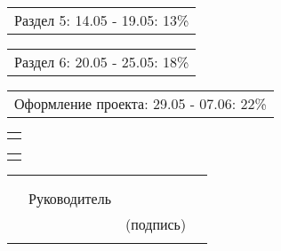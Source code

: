 \documentclass[12pt, А4, twoside]{article}
\begin{document}
\begin{FlushLeft}
		\vspace{-0.1 cm}
		
		\begin{tabular}{p{17.25cm}} 
			\hspace{0.3cm} \textsf{Раздел 5:} \hspace{2.54cm} \textsf{ 14.05 - 19.05:} \hspace{0.5cm} \textsf{13\%} \vspace{1pt} \hline \\
		\end{tabular} 
		
		\vspace{-0.1 cm}
		
		\begin{tabular}{p{17.25cm}} 
			\hspace{0.3cm} \textsf{Раздел 6:} \hspace{2.54cm} \textsf{ 20.05 - 25.05:} \hspace{0.5cm} \textsf{18\%} \vspace{1pt} \hline \\
		\end{tabular} 
		
		\vspace{-0.1 cm}
		
		\begin{tabular}{p{17.25cm}} 
			\hspace{0.3cm} \textsf{Оформление проекта:} \hspace{0.5cm} \textsf{ 29.05 - 07.06:} \hspace{0.5cm} \textsf{22\%} \vspace{1pt} \hline \\
		\end{tabular} 
		
		\begin{tabular}{p{17.25cm}}
			\vspace{0pt} \hline \\
		\end{tabular}
		
		\begin{tabular}{p{17.25cm}}
			\vspace{0pt} \hline  \\
		\end{tabular}
		
		
		
		\begin{tabular}{p{4.2cm} p{3.8cm} p{6.0cm} p{2.0cm}}
			& & &
			\\
			& & &
			\\
			& \fontsize{14}{17.5} \textsf{Руководитель} &
			\vspace{0pt} \hline &
			\\
			& & \centering \fontsize{12}{15} \textsf{(подпись)} &
			\\
			& & &
		\end{tabular}
		

\end{FlushLeft}
\end{document}

